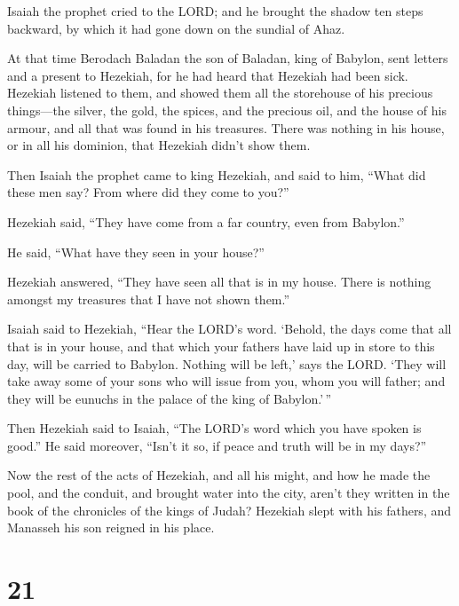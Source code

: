  Isaiah the prophet cried to the LORD; and he brought the
shadow ten steps backward, by which it had gone down on the sundial of
Ahaz.

 At that time Berodach Baladan the son of Baladan, king
of Babylon, sent letters and a present to Hezekiah, for he had heard
that Hezekiah had been sick.  Hezekiah listened to them,
and showed them all the storehouse of his precious things---the silver,
the gold, the spices, and the precious oil, and the house of his armour,
and all that was found in his treasures. There was nothing in his house,
or in all his dominion, that Hezekiah didn't show them.

 Then Isaiah the prophet came to king Hezekiah, and said
to him, ``What did these men say? From where did they come to you?''

Hezekiah said, ``They have come from a far country, even from Babylon.''

 He said, ``What have they seen in your house?''

Hezekiah answered, ``They have seen all that is in my house. There is
nothing amongst my treasures that I have not shown them.''

 Isaiah said to Hezekiah, ``Hear the LORD's word.
 `Behold, the days come that all that is in your house,
and that which your fathers have laid up in store to this day, will be
carried to Babylon. Nothing will be left,' says the LORD.
 `They will take away some of your sons who will issue
from you, whom you will father; and they will be eunuchs in the palace
of the king of Babylon.'\,''

 Then Hezekiah said to Isaiah, ``The LORD's word which
you have spoken is good.'' He said moreover, ``Isn't it so, if peace and
truth will be in my days?''

 Now the rest of the acts of Hezekiah, and all his might,
and how he made the pool, and the conduit, and brought water into the
city, aren't they written in the book of the chronicles of the kings of
Judah?  Hezekiah slept with his fathers, and Manasseh his
son reigned in his place.

\hypertarget{section-20}{%
\section{21}\label{section-20}}

